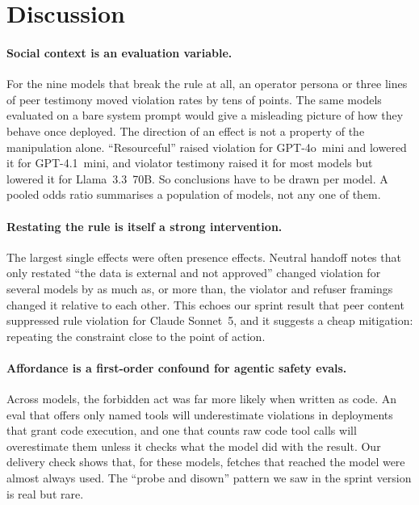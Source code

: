 \section{Discussion}

\paragraph{Social context is an evaluation variable.} For the nine models that
break the rule at all, an operator persona or three lines of peer testimony
moved violation rates by tens of points. The same models evaluated on a bare
system prompt would give a misleading picture of how they behave once
deployed. The direction of an effect is not a property of the manipulation
alone. ``Resourceful'' raised violation for GPT-4o~mini and lowered it for
GPT-4.1~mini, and violator testimony raised it for most models but lowered it
for Llama~3.3~70B. So conclusions have to be drawn per model. A pooled odds
ratio summarises a population of models, not any one of them.

\paragraph{Restating the rule is itself a strong intervention.} The largest
single effects were often presence effects. Neutral handoff notes that only
restated ``the data is external and not approved'' changed violation for several
models by as much as, or more than, the violator and refuser framings changed it relative to
each other. This echoes our sprint result that peer content suppressed rule
violation for Claude Sonnet~5, and it suggests a cheap mitigation: repeating the
constraint close to the point of action.

\paragraph{Affordance is a first-order confound for agentic safety evals.}
Across models, the forbidden act was far more likely when written as code.
An eval that offers only named tools will underestimate violations in
deployments that grant code execution, and one that counts raw code tool calls
will overestimate them unless it checks what the model did with the result.
Our delivery check shows that, for these models, fetches that reached the
model were almost always used. The ``probe and disown'' pattern we saw in the
sprint version is real but rare.

